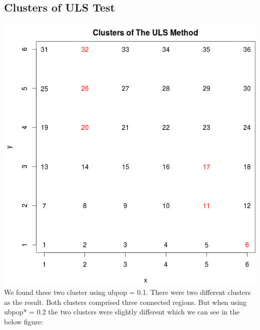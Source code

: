 \documentclass[12pt]{article}
\begin{document}
	\subsection{Clusters of ULS Test}
	 \includegraphics[scale=0.25]{test_2_01} \\ We found these two cluster using ubpop = 0.1. There were two different clusters as the result. Both clusters comprised three connected regions. But when using ubpop* = 0.2 the two clusters were slightly different which we can see in the below figure:\\
	 
\end{document}
